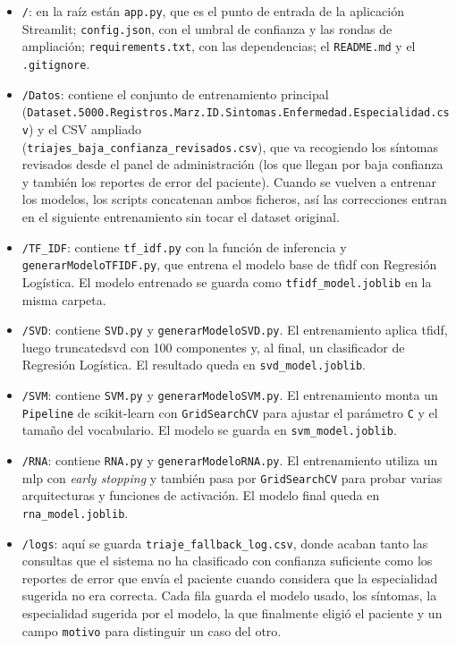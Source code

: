 \begin{itemize}
	\item \texttt{/}: en la raíz están \texttt{app.py}, que es el punto de entrada de la aplicación Streamlit; \texttt{config.json}, con el umbral de confianza y las rondas de ampliación; \texttt{requirements.txt}, con las dependencias; el \texttt{README.md} y el \texttt{.gitignore}.
	
	\item \texttt{/Datos}: contiene el conjunto de entrenamiento principal\\
	(\texttt{Dataset.5000.Registros.Marz.ID.Sintomas.Enfermedad.Especialidad.csv}) y el CSV ampliado\\
	(\texttt{triajes\_baja\_confianza\_revisados.csv}), que va recogiendo los síntomas revisados desde el panel de administración (los que llegan por baja confianza y también los reportes de error del paciente). Cuando se vuelven a entrenar los modelos, los scripts concatenan ambos ficheros, así las correcciones entran en el siguiente entrenamiento sin tocar el dataset original.
	
	\item \texttt{/TF\_IDF}: contiene \texttt{tf\_idf.py} con la función de inferencia y \texttt{generarModeloTFIDF.py}, que entrena el modelo base de \gls{tfidf} con Regresión Logística. El modelo entrenado se guarda como \texttt{tfidf\_model.joblib} en la misma carpeta.
	
	\item \texttt{/SVD}: contiene \texttt{SVD.py} y \texttt{generarModeloSVD.py}. El entrenamiento aplica \gls{tfidf}, luego \gls{truncatedsvd} con 100 componentes y, al final, un clasificador de Regresión Logística. El resultado queda en \texttt{svd\_model.joblib}.
	
	\item \texttt{/SVM}: contiene \texttt{SVM.py} y \texttt{generarModeloSVM.py}. El entrenamiento monta un \texttt{Pipeline} de scikit-learn con \texttt{GridSearchCV} para ajustar el parámetro \texttt{C} y el tamaño del vocabulario. El modelo se guarda en \texttt{svm\_model.joblib}.
	
	\item \texttt{/RNA}: contiene \texttt{RNA.py} y \texttt{generarModeloRNA.py}. El entrenamiento utiliza un \gls{mlp} con \textit{early stopping} y también pasa por \texttt{GridSearchCV} para probar varias arquitecturas y funciones de activación. El modelo final queda en \texttt{rna\_model.joblib}.
	
	\item \texttt{/logs}: aquí se guarda \texttt{triaje\_fallback\_log.csv}, donde acaban tanto las consultas que el sistema no ha clasificado con confianza suficiente como los reportes de error que envía el paciente cuando considera que la especialidad sugerida no era correcta. Cada fila guarda el modelo usado, los síntomas, la especialidad sugerida por el modelo, la que finalmente eligió el paciente y un campo \texttt{motivo} para distinguir un caso del otro.
	

\end{itemize}
